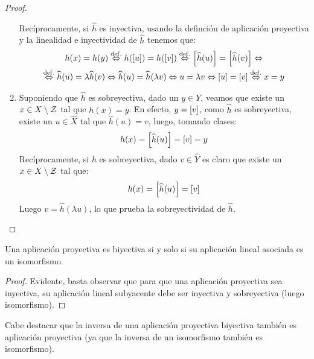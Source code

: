 \begin{proof}
\begin{enumerate}
		Recíprocamente, si $\widehat{h}$ es inyectiva, usando la definción de aplicación proyectiva y la linealidad e inyectividad de $\widehat{h}$ tenemos que:
		\begin{multline*}
			h(x)=h(y)\stackrel{\mathrm{def.}}{\Leftrightarrow} h(\left [ u \right ])=h(\left [ v \right ])\stackrel{\mathrm{def.}}{\Leftrightarrow}\left [ \widehat{h}(u) \right ]=\left [ \widehat{h}(v) \right ]\Leftrightarrow\\\stackrel{\mathrm{def.}}{\Leftrightarrow}\widehat{h}(u)=\lambda \widehat{h}(v)\Leftrightarrow\widehat{h}(u)=\widehat{h}(\lambda v)\Leftrightarrow u = \lambda v\Leftrightarrow\left [ u \right ]=\left [ v \right ]\stackrel{\mathrm{def.}}{\Leftrightarrow} x=y
		\end{multline*}
		\item Suponiendo que $\widehat{h}$ es sobreyectiva, dado un $y\in Y$, veamos que existe un $x\in X\setminus\mathcal{Z}$ tal que $h(x)=y$. En efecto, $y=\left [ v \right ]$, como $\widehat{h}$ es sobreyectiva, existe un $u\in \widehat{X}$ tal que $\widehat{h}(u)=v$, luego, tomando clases:
		\[h(x)=\left [ \widehat{h}(u) \right ]=\left [ v \right ]=y\]
		Recíprocamente, si $h$ es sobreyectiva, dado $v\in\widehat{Y}$ es claro que existe un $x\in X\setminus\mathcal{Z}$ tal que: 
		\[h(x)=\left [ \widehat{h}(u) \right ]=\left [ v \right ]\]
		Luego $v=\widehat{h}(\lambda u)$, lo que prueba la sobreyectividad de $\widehat{h}$.
	\end{enumerate}
\end{proof}
\begin{cor}[Biyectividad]\label{C4_cor_biyectividad}
	Una aplicación proyectiva es biyectiva si y solo si su aplicación lineal asociada es un isomorfismo.
\end{cor}
\begin{proof}
	Evidente, basta observar que para que una aplicación proyectiva sea inyectiva, su aplicación lineal subyacente debe ser inyectiva y sobreyectiva (luego isomorfismo).
\end{proof}
Cabe destacar que la inversa de una aplicación proyectiva biyectiva también es aplicación proyectiva (ya que la inversa de un isomorfismo también es isomorfismo).

